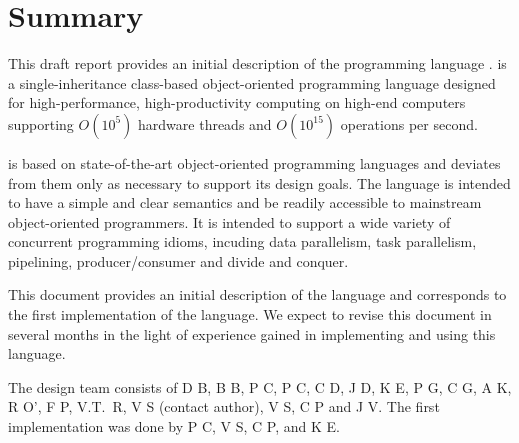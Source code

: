 
\thispagestyle{empty}




\chapter*{Summary}

This draft report provides an initial description of the programming
language \Xten. \Xten{} is a single-inheritance class-based object-oriented
programming language designed for high-performance, high-productivity
computing on high-end computers supporting $O(10^5)$ hardware threads
and $O(10^{15})$ operations per second. 

{}\Xten{} is based on state-of-the-art object-oriented programming
languages and deviates from them only as necessary to support its
design goals. The language is intended to have a simple and clear
semantics and be readily accessible to mainstream object-oriented
programmers. It is intended to support a wide variety of concurrent
programming idioms, incuding data parallelism, task parallelism,
pipelining, producer/consumer and divide and conquer.

This document provides an initial description of the language and 
corresponds to the first implementation of the language.
We expect to revise this document in several months in the light of
experience gained in implementing and using this language.

The \Xten{} design team consists of 
D B, 
B B, 
P C, 
P C, 
C D, 
J D, 
K E, 
P G, 
C G, 
A K, 
R O', 
F P, 
V.T.~R, 
V S (contact author), 
V S,
C P
and 
J V.
The first implementation was done by
P C, 
V S,
C P,
and K E. 

